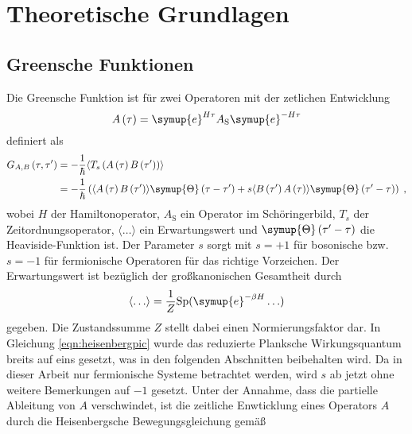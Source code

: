 \chapter{Theoretische Grundlagen}
\label{chap:theoretische_grundlagen}
\section{Greensche Funktionen}
Die Greensche Funktion ist für zwei Operatoren mit der zetlichen Entwicklung 
\begin{equation}
    A \left ( \tau \right ) = \symup{e}^{H \tau} A_\text{S} \symup{e}^{-H \tau}  \label{eqn:heisenbergpic}
\end{equation}
definiert als 
\begin{align}
    G_{A,B} \left (\tau, \tau' \right ) &= - \frac{1}{\hbar} \langle T_s \left ( A \left (\tau \right ) B \left ( \tau' \right ) \right ) \rangle \\
    & = - \frac{1}{\hbar} \left(  \langle A \left (\tau \right ) B \left ( \tau' \right ) \rangle \symup{\Theta} \left ( \tau - \tau' \right) + s 
    \langle B \left ( \tau' \right ) A \left (\tau \right ) \rangle \symup{\Theta} \left ( \tau' - \tau \right)  \right ) \; \text{,} \label{eqn:greensfunction}
\end{align}
wobei $H$ der Hamiltonoperator, $A_\text{S}$ ein Operator im Schöringerbild, $T_s$ der Zeitordnungsoperator, 
$\langle \ldots \rangle$ ein Erwartungswert und $\symup{\Theta} \left ( \tau' - \tau \right)$ die Heaviside-Funktion ist.\cite{greensfunction}
Der Parameter $s$ sorgt mit $s=+1$ für bosonische bzw. $s=-1$ für fermionische Operatoren für das richtige Vorzeichen.
Der Erwartungswert ist bezüglich der großkanonischen Gesamtheit durch 
\begin{equation*}
    \langle \ldots \rangle = \frac{1}{Z} \text{Sp}(\symup{e}^{-\beta H} \ldots)
\end{equation*}
gegeben.\cite{greensfunction}
Die Zustandssumme $Z$ stellt dabei einen Normierungsfaktor dar.
In Gleichung \eqref{eqn:heisenbergpic} wurde das reduzierte Planksche Wirkungsquantum breits auf eins gesetzt, was in den folgenden Abschnitten beibehalten wird.
Da in dieser Arbeit nur fermionische Systeme betrachtet werden, wird $s$ ab jetzt ohne weitere Bemerkungen auf $-1$ gesetzt.
Unter der Annahme, dass die partielle Ableitung von $A$ verschwindet, ist die zeitliche Enwticklung eines Operators 
$A$ durch die Heisenbergsche Bewegungsgleichung gemäß 
